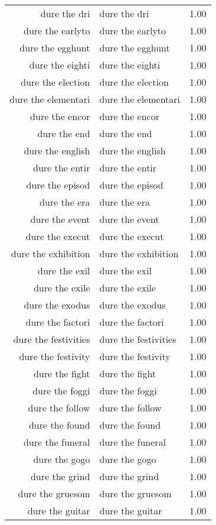 \begin{table}[ht]
\begin{tabular}{rlr}
  dure the dri & dure the dri & 1.00 \\ 
  dure the earlyto & dure the earlyto & 1.00 \\ 
  dure the egghunt & dure the egghunt & 1.00 \\ 
  dure the eighti & dure the eighti & 1.00 \\ 
  dure the election & dure the election & 1.00 \\ 
  dure the elementari & dure the elementari & 1.00 \\ 
  dure the encor & dure the encor & 1.00 \\ 
  dure the end & dure the end & 1.00 \\ 
  dure the english & dure the english & 1.00 \\ 
  dure the entir & dure the entir & 1.00 \\ 
  dure the episod & dure the episod & 1.00 \\ 
  dure the era & dure the era & 1.00 \\ 
  dure the event & dure the event & 1.00 \\ 
  dure the execut & dure the execut & 1.00 \\ 
  dure the exhibition & dure the exhibition & 1.00 \\ 
  dure the exil & dure the exil & 1.00 \\ 
  dure the exile & dure the exile & 1.00 \\ 
  dure the exodus & dure the exodus & 1.00 \\ 
  dure the factori & dure the factori & 1.00 \\ 
  dure the festivities & dure the festivities & 1.00 \\ 
  dure the festivity & dure the festivity & 1.00 \\ 
  dure the fight & dure the fight & 1.00 \\ 
  dure the foggi & dure the foggi & 1.00 \\ 
  dure the follow & dure the follow & 1.00 \\ 
  dure the found & dure the found & 1.00 \\ 
  dure the funeral & dure the funeral & 1.00 \\ 
  dure the gogo & dure the gogo & 1.00 \\ 
  dure the grind & dure the grind & 1.00 \\ 
  dure the gruesom & dure the gruesom & 1.00 \\ 
  dure the guitar & dure the guitar & 1.00 \\ 

\end{tabular}
\end{table}
